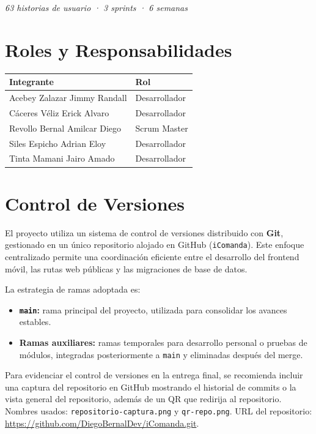 \bigskip
\begin{center}
\textit{63 historias de usuario · 3 sprints · 6 semanas}
\end{center}


\section{Roles y Responsabilidades}

\begin{center}
\begin{tabular}{ll}
  \toprule
  \textbf{Integrante} & \textbf{Rol} \\
  \midrule
  Acebey Zalazar Jimmy Randall & Desarrollador \\
  Cáceres Véliz Erick Alvaro   & Desarrollador \\
  Revollo Bernal Amilcar Diego & Scrum Master \\
  Siles Espicho Adrian Eloy    & Desarrollador  \\
  Tinta Mamani Jairo Amado     & Desarrollador \\
  \bottomrule
\end{tabular}
\end{center}


\section{Control de Versiones}

El proyecto utiliza un sistema de control de versiones distribuido con
\textbf{Git}, gestionado en un único repositorio alojado en GitHub
(\texttt{iComanda}). Este enfoque centralizado permite una
coordinación eficiente entre el desarrollo del frontend móvil, las rutas
web públicas y las migraciones de base de datos.

La estrategia de ramas adoptada es:

\begin{itemize}[leftmargin=1.5em]
  \item \textbf{\texttt{main}:} rama principal del proyecto, utilizada para consolidar los avances estables.
  \item \textbf{Ramas auxiliares:} ramas temporales para desarrollo personal o pruebas de módulos, integradas posteriormente a \texttt{main} y eliminadas después del merge.
\end{itemize}

\begin{notabox}
Para evidenciar el control de versiones en la entrega final, se recomienda incluir
una captura del repositorio en GitHub mostrando el historial de commits o la vista
general del repositorio, además de un QR que redirija al repositorio. Nombres usados:
\texttt{repositorio-captura.png} y \texttt{qr-repo.png}. URL del repositorio:
\url{https://github.com/DiegoBernalDev/iComanda.git}.
\end{notabox}


